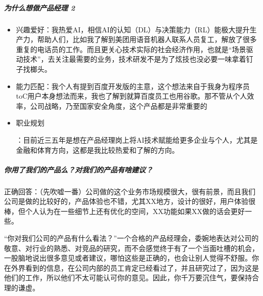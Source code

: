 \documentclass[letterpaper,10pt,english]{sphinxmanual}
\begin{document}
\subparagraph{为什么想做产品经理 2\sphinxfootnotemark[861]}
\label{\detokenize{chapter_interview/question:id11}}%
\begin{footnotetext}[861]\sphinxAtStartFootnote
{}
%
\end{footnotetext}\ignorespaces \begin{itemize}
\item {} 
兴趣爱好：我热爱AI，相信AI的认知（DL）与决策能力（RL）能极大提升生产力，帮助人们，比如我了解到美团用语音机器人联系人员复工，解放了很多重复的电话员的工作。而且更关心技术实际的社会经济作用，也就是“场景驱动技术”，去关注最需要的业务，技术研发不是为了炫技也没必要一味拿着钉子找榔头。

\item {} 
能力匹配：我个人有提到百度开发版的主意，这个想法来自于我身为程序员toC用户本身想法而来，我也了解到就算百度员工也用谷歌。那不管从个人效率，公司战略，乃至国家安全角度，这个产品都是非常重要的

\item {} 
职业规划%
\begin{footnote}[862]\sphinxAtStartFootnote
{}
%
\end{footnote}：目前近三五年是想在产品经理岗上将AI技术赋能给更多企业与个人，尤其是金融和体育方向，这都是我比较热爱和了解的方向。

\end{itemize}


\subparagraph{你用了我们的产品么？对我们的产品有啥建议？}
\label{\detokenize{chapter_interview/question:id12}}
正确回答：（先吹嘘一番）公司做的这个业务市场规模很大，很有前景，而且我们公司是做的比较好的，产品体验也不错，尤其XX地方，设计的很好，用户体验很棒，但个人认为在一些细节上还有优化的空间，XX功能如果XX做的话会更好一些。

“你对我们公司的产品有什么看法？”一个合格的产品经理会，委婉地表达对公司的敬意、对行业的熟悉、对竞品的研究，而不会感觉终于有了一个当面吐槽的机会，一股脑地说出很多意见或者建议，哪怕这些是正确的，也会让别人觉得不舒服。你在外界看到的信息，在公司内部的员工肯定已经看过了，并且研究过了，因为这是他们的工作，所以他们不太可能认可你的意见。因此，你千万要沉住气，要保持合理的谦虚。
%
\begin{footnote}[863]\sphinxAtStartFootnote
{}
%
\end{footnote}
\end{document}
